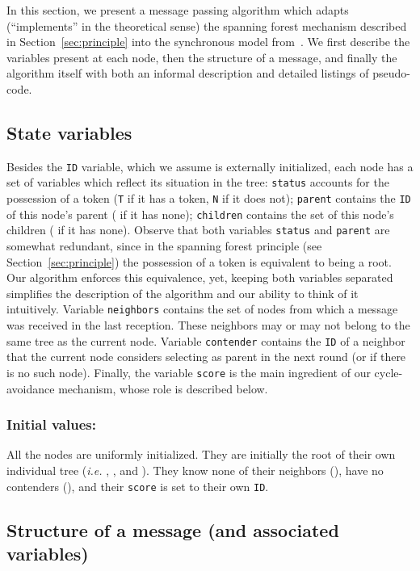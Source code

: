 \documentclass[twocolumn]{article}
\begin{document}
In this section, we present a message passing algorithm which adapts (``implements'' in the theoretical sense) the spanning forest mechanism described in Section~\ref{sec:principle} into the synchronous model from~\cite{KLO10}. We first describe the variables present at each node, then the structure of a message, and finally the algorithm itself with both an informal description and detailed listings of pseudo-code.

\subsection{State variables}
\label{sec:variables}

Besides the {\tt ID} variable, which we assume is externally initialized, each node has a set of variables which reflect its situation in the tree:
\texttt{status} accounts for the possession of a token ({\tt T} if it has a token, {\tt N} if it does not);
\texttt{parent} contains the {\tt ID} of this node's parent ( if it has none); \texttt{children} contains the set of this node's children ( if it has none).
Observe that both variables {\tt status} and {\tt parent} are somewhat redundant, since in the spanning forest principle (see Section~\ref{sec:principle}) the possession of a token is equivalent to being a root. Our algorithm enforces this equivalence, yet, keeping both variables separated simplifies the description of the algorithm and our ability to think of it intuitively.
Variable {\tt neighbors} contains the set of nodes from which a message was received in the last reception. These neighbors may or may not belong to the same tree as the current node. Variable {\tt contender} contains the {\tt ID} of a neighbor that the current node considers selecting as parent in the next round (or  if there is no such node). Finally, the variable {\tt score} is the main ingredient of our cycle-avoidance mechanism, whose role is described below. 

\subsubsection{Initial values:} All the nodes are uniformly initialized. They are initially the root of their own individual tree ({\it i.e.} , , and ). They know none of their neighbors (), have no contenders (), and their {\tt score} is set to their own {\tt ID}.


\subsection{Structure of a message (and associated variables)}
\end{document}
